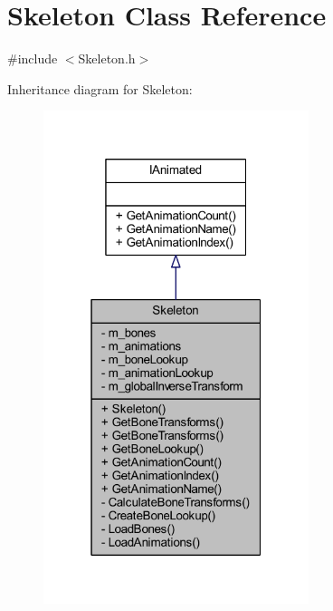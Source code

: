 \hypertarget{class_skeleton}{}\section{Skeleton Class Reference}
\label{class_skeleton}


{\ttfamily \#include $<$Skeleton.\+h$>$}



Inheritance diagram for Skeleton\+:\nopagebreak
\begin{figure}[H]
\begin{center}
\leavevmode
\includegraphics[width=220pt]{class_skeleton__inherit__graph}
\end{center}
\end{figure}


